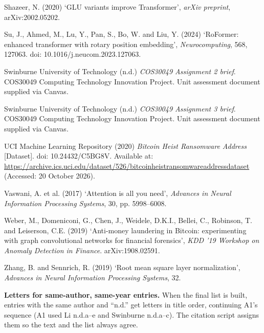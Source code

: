 \begin{references}
\item Shazeer, N. (2020) ‘GLU variants improve Transformer’, \textit{arXiv preprint}, arXiv:2002.05202.

\item Su, J., Ahmed, M., Lu, Y., Pan, S., Bo, W. and Liu, Y. (2024) ‘RoFormer: enhanced transformer with rotary position embedding’, \textit{Neurocomputing}, 568, 127063. doi: 10.1016/j.neucom.2023.127063.

\item Swinburne University of Technology (n.d.) \textit{COS30049 Assignment 2 brief}. COS30049 Computing Technology Innovation Project. Unit assessment document supplied via Canvas. \textdaggerdbl

\item Swinburne University of Technology (n.d.) \textit{COS30049 Assignment 3 brief}. COS30049 Computing Technology Innovation Project. Unit assessment document supplied via Canvas. \textdaggerdbl

\item UCI Machine Learning Repository (2020) \textit{Bitcoin Heist Ransomware Address} [Dataset]. doi: 10.24432/C5BG8V. Available at: \url{https://archive.ics.uci.edu/dataset/526/bitcoinheistransomwareaddressdataset} (Accessed: 20 October 2026). \textdagger\ \textdaggerdbl

\item Vaswani, A. et al. (2017) ‘Attention is all you need’, \textit{Advances in Neural Information Processing Systems}, 30, pp. 5998–6008.

\item Weber, M., Domeniconi, G., Chen, J., Weidele, D.K.I., Bellei, C., Robinson, T. and Leiserson, C.E. (2019) ‘Anti-money laundering in Bitcoin: experimenting with graph convolutional networks for financial forensics’, \textit{KDD '19 Workshop on Anomaly Detection in Finance}. arXiv:1908.02591.

\item Zhang, B. and Sennrich, R. (2019) ‘Root mean square layer normalization’, \textit{Advances in Neural Information Processing Systems}, 32.
\end{references}

\textbf{Letters for same-author, same-year entries.} When the final list is built, entries with
the same author and ``n.d.'' get letters in title order, continuing A1's sequence (A1 used Li
n.d.a--e and Swinburne n.d.a--c). The citation script assigns them so the text and the list
always agree.

